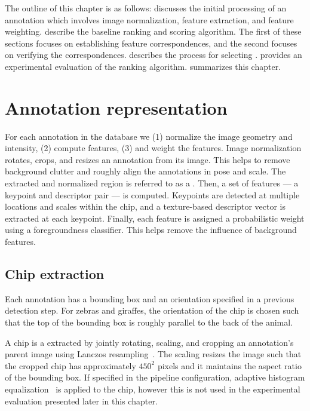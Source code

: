     The outline of this chapter is as follows:  discusses the initial processing of an
    annotation which involves image normalization, feature extraction, and feature weighting.
     describe the baseline ranking and scoring algorithm. The first of these
    sections focuses on establishing feature correspondences, and the second focuses on verifying the
    correspondences.  describes the process for selecting \exemplars{}.
     provides an experimental evaluation of the ranking algorithm.
     summarizes this chapter.

    \rankedmatches{}

\section{Annotation representation}\label{sec:annotrepr}
  
    For each annotation in the database we (1) normalize the image geometry and intensity, (2) compute features,
    (3) and weight the features.
    Image normalization rotates, crops, and resizes an annotation from its image. This helps to remove background
    clutter and roughly align the annotations in pose and scale. The extracted and normalized region is referred to
    as a .
    Then, a set of features ---  a keypoint and descriptor pair --- is computed. Keypoints are detected at multiple
    locations and scales within the chip, and a texture-based descriptor vector is extracted at each keypoint.
    Finally, each feature is assigned a probabilistic weight using a foregroundness classifier. This helps remove
    the influence of background features.

    \subsection{Chip extraction}

        Each annotation has a bounding box and an orientation specified in a previous detection step. For zebras
        and giraffes, the orientation of the chip is chosen such that the top of the bounding box is roughly
        parallel to the back of the animal.

        A chip is a extracted by jointly rotating, scaling, and cropping an annotation's parent image using Lanczos
        resampling~\cite{lanczos_applied_1988}. The scaling resizes the image such that the cropped chip has
        approximately $450^2$ pixels and it maintains the aspect ratio of the bounding box. If specified in the
        pipeline configuration, adaptive histogram equalization~\cite{pizer_adaptive_1987} is applied to the chip,
        however this is not used in the experimental evaluation presented later in this chapter.

